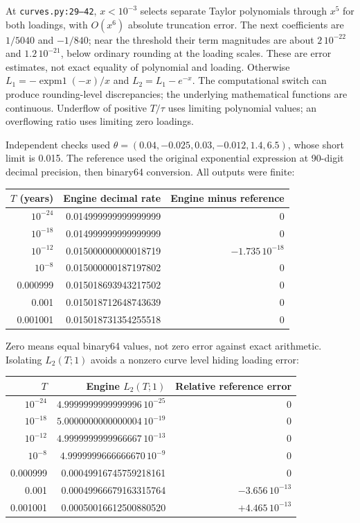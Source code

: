 \documentclass[12pt,a4paper]{article}
\begin{document}
At \texttt{curves.py:29--42}, $x<10^{-3}$ selects separate Taylor
polynomials through $x^5$ for both loadings, with $O(x^6)$ absolute
truncation error. The next coefficients are $1/5040$ and $-1/840$;
near the threshold their term magnitudes are about $2\,10^{-22}$
and $1.2\,10^{-21}$, below ordinary rounding at the loading scales.
These are error estimates, not exact equality of polynomial and loading.
Otherwise $L_1=-\operatorname{expm1}(-x)/x$ and $L_2=L_1-e^{-x}$.
The computational switch can produce rounding-level discrepancies;
the underlying mathematical functions are continuous.
Underflow of positive $T/\tau$ uses limiting polynomial values;
an overflowing ratio uses limiting zero loadings.

Independent checks used
$\theta=(0.04,-0.025,0.03,-0.012,1.4,6.5)$, whose short limit is 0.015.
The reference used the original exponential expression at 90-digit
decimal precision, then binary64 conversion. All outputs were finite:
\begin{center}\small
\begin{tabular}{@{}rrr@{}}
\toprule
$T$ (years) & Engine decimal rate & Engine minus reference\\
\midrule
$10^{-24}$ & 0.014999999999999999 & 0\\
$10^{-18}$ & 0.014999999999999999 & 0\\
$10^{-12}$ & 0.015000000000018719 & $-1.735\,10^{-18}$\\
$10^{-8}$ & 0.015000000187197802 & 0\\
0.000999 & 0.015018693943217502 & 0\\
0.001 & 0.015018712648743639 & 0\\
0.001001 & 0.015018731354255518 & 0\\
\bottomrule
\end{tabular}
\end{center}
Zero means equal binary64 values, not zero error against exact arithmetic.
Isolating $L_2(T;1)$ avoids a nonzero curve level hiding loading error:
\begin{center}\small
\begin{tabular}{@{}rrr@{}}
\toprule
$T$ & Engine $L_2(T;1)$ & Relative reference error\\
\midrule
$10^{-24}$ & $4.9999999999999996\,10^{-25}$ & 0\\
$10^{-18}$ & $5.0000000000000004\,10^{-19}$ & 0\\
$10^{-12}$ & $4.9999999999966667\,10^{-13}$ & 0\\
$10^{-8}$ & $4.9999999666666670\,10^{-9}$ & 0\\
0.000999 & 0.00049916745759218161 & 0\\
0.001 & 0.00049966679163315764 & $-3.656\,10^{-13}$\\
0.001001 & 0.00050016612500880520 & $+4.465\,10^{-13}$\\
\bottomrule
\end{tabular}
\end{center}
\end{document}
